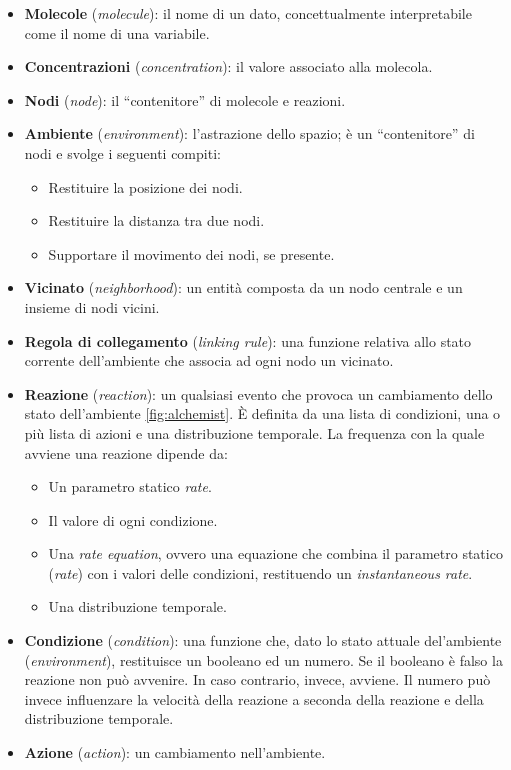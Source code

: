 \begin{itemize}
    \item \textbf{Molecole} (\textit{molecule}): il nome di un dato, concettualmente interpretabile come il nome di una variabile.
    \item \textbf{Concentrazioni} (\textit{concentration}): il valore associato alla molecola.
    \item \textbf{Nodi}\label{node} (\textit{node}): il ``contenitore'' di molecole e reazioni.
    \item \textbf{Ambiente} (\textit{environment}): l'astrazione dello spazio; è un “contenitore” di nodi e svolge i seguenti compiti:
    \begin{itemize}
        \item Restituire la posizione dei nodi.
        \item Restituire la distanza tra due nodi.
        \item Supportare il movimento dei nodi, se presente.
    \end{itemize}
    \item \textbf{Vicinato} (\textit{neighborhood}): un entità composta da un nodo centrale e un insieme di nodi vicini.
    \item \textbf{Regola di collegamento} (\textit{linking rule}): una funzione relativa allo stato corrente dell'ambiente che associa ad ogni nodo un vicinato.
    \item \textbf{Reazione} (\textit{reaction}): un qualsiasi evento che provoca un cambiamento dello stato dell'ambiente \cref{fig:alchemist}. È definita da una lista di condizioni, una o più lista di azioni e una distribuzione temporale. La frequenza con la quale avviene una reazione dipende da:
    \begin{itemize}
        \item Un parametro statico \textit{rate}.
        \item Il valore di ogni condizione.
        \item Una \textit{rate equation}, ovvero una equazione che combina il parametro statico (\textit{rate}) con i valori delle condizioni, restituendo un \textit{instantaneous rate}.
        \item Una distribuzione temporale.
    \end{itemize}
    \item \textbf{Condizione} (\textit{condition}): una funzione che, dato lo stato attuale del'ambiente (\textit{environment}), restituisce un booleano ed un numero. Se il booleano è falso la reazione non può avvenire. In caso contrario, invece, avviene. Il numero può invece influenzare la velocità della reazione a seconda della reazione e della distribuzione temporale.
    \item \textbf{Azione} (\textit{action}): un cambiamento nell'ambiente.
\end{itemize}
